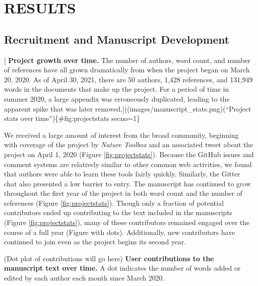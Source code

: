\documentclass[sigconf]{acmart}
\begin{document}
\hypertarget{results}{%
\section{RESULTS}\label{results}}

\hypertarget{recruitment-and-manuscript-development}{%
\subsection{Recruitment and Manuscript Development}\label{recruitment-and-manuscript-development}}

{[}
\textbf{Project growth over time.}
The number of authors, word count, and number of references have all grown dramatically from when the project began on March 20, 2020.
As of April 30, 2021, there are 50 authors, 1,428 references, and 131,949 words in the documents that make up the project.
For a period of time in summer 2020, a large appendix was erroneously duplicated, leading to the apparent spike that was later removed.{]}((images/manuscript\_stats.png)(``Project stats over time'')\{\#fig:projectstats secno=1\}

We received a large amount of interest from the broad community, beginning with coverage of the project by \emph{Nature Toolbox} \citep{AE0QcVgJ} and an associated tweet about the project on April 1, 2020 \citep{Ygqb6P2w} (Figure \ref{fig:projectstats}).
Because the GitHub issues and comment systems are relatively similar to other common web activities, we found that authors were able to learn these tools fairly quickly.
Similarly, the Gitter chat also presented a low barrier to entry.
The manuscript has continued to grow throughout the first year of the project in both word count and the number of references (Figure \ref{fig:projectstats}).
Though only a fraction of potential contributors ended up contributing to the text included in the manuscripts (Figure \ref{fig:projectstats}), many of these contributors remained engaged over the course of a full year (Figure with dots).
Additionally, new contributors have continued to join even as the project begins its second year.

(Dot plot of contributions will go here)
\textbf{User contributions to the manuscript text over time.}
A dot indicates the number of words added or edited by each author each month since March 2020.
\end{document}
